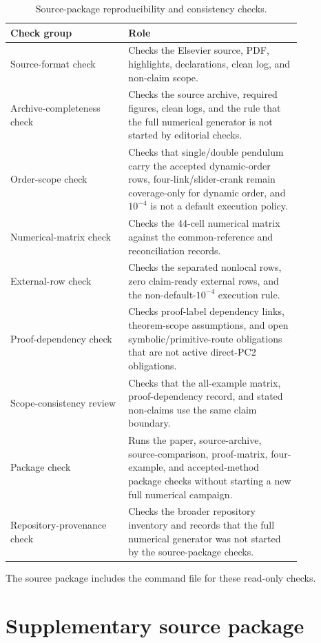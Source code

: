 \documentclass[preprint,12pt]{elsarticle}
\begin{document}
\begin{table}[htbp]
\centering
\caption{Source-package reproducibility and consistency checks.}
\label{tab:validators}
\footnotesize
\setlength{\tabcolsep}{4pt}
\renewcommand{\arraystretch}{0.92}
\begin{tabular}{P{0.34\linewidth}P{0.50\linewidth}}
\toprule
Check group & Role \\
\midrule
Source-format check &
Checks the Elsevier source, PDF, highlights, declarations, clean log, and
non-claim scope. \\
Archive-completeness check &
Checks the source archive, required figures, clean logs, and the rule that
the full numerical generator is not started by editorial checks. \\
Order-scope check &
Checks that single/double pendulum carry the accepted dynamic-order rows,
four-link/slider-crank remain coverage-only for dynamic order, and
$10^{-4}$ is not a default execution policy. \\
Numerical-matrix check &
Checks the 44-cell numerical matrix against the common-reference and reconciliation
records. \\
External-row check &
Checks the separated nonlocal rows, zero claim-ready external rows, and the
non-default-\(10^{-4}\) execution rule. \\
Proof-dependency check &
Checks proof-label dependency links, theorem-scope assumptions, and open
symbolic/primitive-route obligations that are not active direct-PC2
obligations. \\
Scope-consistency review &
Checks that the all-example matrix, proof-dependency record, and stated
non-claims use the same claim boundary. \\
Package check &
Runs the paper, source-archive, source-comparison, proof-matrix, four-example, and
accepted-method package checks without starting a new full numerical campaign. \\
Repository-provenance check &
Checks the broader repository inventory and records that the full numerical
generator was not started by the source-package checks. \\
\bottomrule
\end{tabular}
\end{table}

The source package includes the command file for these read-only checks.

\section{Supplementary source package}
\end{document}
